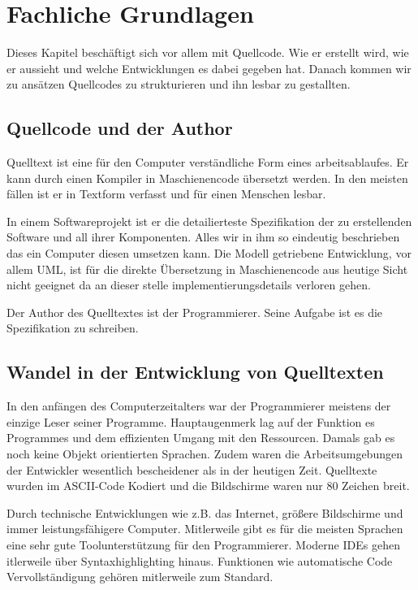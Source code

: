 
\section{Fachliche Grundlagen}

Dieses Kapitel beschäftigt sich vor allem mit Quellcode.
Wie er erstellt wird, wie er aussieht und welche Entwicklungen es dabei gegeben hat.
Danach kommen wir zu ansätzen Quellcodes zu strukturieren und ihn lesbar zu gestallten.

\subsection{Quellcode und der Author}

Quelltext ist eine für den Computer verständliche Form
eines arbeitsablaufes. Er kann durch einen Kompiler in Maschienencode übersetzt werden.
In den meisten fällen ist er in Textform verfasst und für einen Menschen lesbar.

In einem Softwareprojekt ist er die detailierteste Spezifikation der zu erstellenden
Software und all ihrer Komponenten. Alles wir in ihm so eindeutig beschrieben
das ein Computer diesen umsetzen kann. Die Modell getriebene Entwicklung, vor allem
UML, ist für die direkte Übersetzung in Maschienencode aus heutige Sicht nicht geeignet
da an dieser stelle implementierungsdetails verloren gehen. \cite[S. 26]{Martin}

Der Author des Quelltextes ist der Programmierer. Seine Aufgabe ist es
die Spezifikation zu schreiben.

\subsection{Wandel in der Entwicklung von Quelltexten}

In den anfängen des Computerzeitalters war der Programmierer meistens der einzige
Leser seiner Programme. Hauptaugenmerk lag auf der Funktion es Programmes
und dem effizienten Umgang mit den Ressourcen. Damals gab es noch keine
Objekt orientierten Sprachen. Zudem waren die Arbeitsumgebungen der Entwickler
wesentlich bescheidener als in der heutigen Zeit. Quelltexte wurden im ASCII-Code
Kodiert und die Bildschirme waren nur 80 Zeichen breit.

Durch technische Entwicklungen wie z.B. das Internet, größere Bildschirme und
immer leistungsfähigere Computer. Mitlerweile gibt es für die meisten Sprachen
eine sehr gute Toolunterstützung für den Programmierer. Moderne IDEs gehen
 itlerweile über Syntaxhighlighting hinaus. Funktionen wie automatische Code
Vervollständigung gehören mitlerweile zum Standard.

